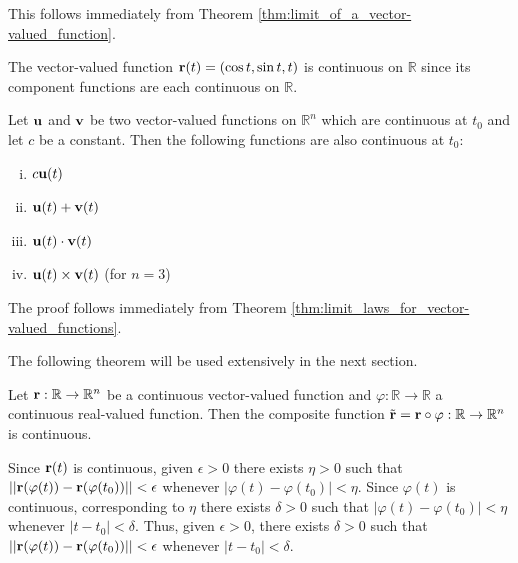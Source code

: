\documentclass[12pt,letterpaper,reqno]{article}
\numberwithin{equation}{section}
\newcommand{\R}{\ensuremath{\mathbb R}}
\newcommand{\bu}{{\bf u}}
\newcommand{\bv}{{\bf v}}
\newcommand{\bbr}{{\bf r}}
\begin{document}
{\begin{pf}
This follows immediately from Theorem \ref{thm:limit_of_a_vector-valued_function}.	
\end{pf}

\begin{example}
The vector-valued function $\bbr(t)=(\cos t, \sin t, t)$ is continuous on $\R$ since its component functions are each continuous on $\R$.	
\end{example}

\begin{thm}
Let $\bu$ and $\bv$ be two vector-valued functions on $\R^n$ which are continuous at $t_0$ and let $c$ be a constant. Then the following functions are also continuous at $t_0$:
\begin{enumerate}[(i)]
	\item $c\bu(t)$
	\item $\bu(t)+\bv(t)$
	\item $\bu(t) \cdot \bv(t)$
	\item $\bu(t) \times \bv(t)$ (for $n=3$)
\end{enumerate}	
\end{thm}

\begin{pf}
	The proof follows immediately from Theorem \ref{thm:limit_laws_for_vector-valued_functions}. 
\end{pf}

The following theorem will be used extensively in the next section.

\begin{thm}
	Let $\bbr:\R \to \R^n$ be a continuous vector-valued function and $\varphi:\R \to \R$ a continuous real-valued function. Then the composite function $\tilde{\bbr}=\bbr \circ \varphi:\R \to \R^n$ is continuous.
\end{thm}

\begin{pf}
Since $\bbr(t)$ is continuous, given $\epsilon>0$ there exists $\eta>0$ such that $||\bbr(\varphi(t))-\bbr(\varphi(t_0))||<\epsilon$ whenever $|\varphi(t)-\varphi(t_0)|<\eta$. Since $\varphi(t)$ is continuous, corresponding to $\eta$ there exists $\delta>0$ such that $|\varphi(t)-\varphi(t_0)|<\eta$ whenever $|t-t_0|<\delta$. Thus, given $\epsilon>0$, there exists $\delta>0$ such that $||\bbr(\varphi(t))-\bbr(\varphi(t_0))||<\epsilon$ whenever $|t-t_0|<\delta$.
\end{pf}

}
\end{document}
